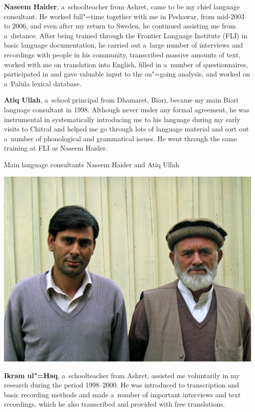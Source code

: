 \textbf{Naseem Haider}, a~schoolteacher from Ashret, came to be my chief language consultant. He
worked full"=time together with me in Peshawar, from mid-2003 to 2006, and even after my return to
Sweden, he continued assisting me from a~distance. After being trained through the Frontier Language
Institute (FLI) in basic language documentation, he carried out a~large number of interviews and
recordings with people in his community, transcribed massive amounts of text, worked with me on
translation into English, filled in a~number of questionnaires, participated in and gave valuable
input to the on"=going analysis, and worked on a~Palula lexical database.


\textbf{Atiq Ullah}, a~school principal from Dhamaret, Biori, became my main Biori language
consultant in 1998. Although never under any formal agreement, he was instrumental in systematically
introducing me to his language during my early visits to Chitral and helped me go through lots of
language material and sort out a~number of phonological and grammatical issues. He went through the
same training at FLI as Naseem Haider.

\begin{photofigure}[h!]
\caption{Main language consultants Naseem Haider and Atiq Ullah}
\includegraphics[width=\textwidth]{figures/ch1photo1.jpg}
\end{photofigure}

\textbf{Ikram ul"=Haq}, a~schoolteacher from Ashret, assisted me voluntarily in my research during
the period 1998--2000. He was introduced to transcription and basic recording methods and made
a~number of important interviews and text recordings, which he also transcribed and provided with
free translations.


